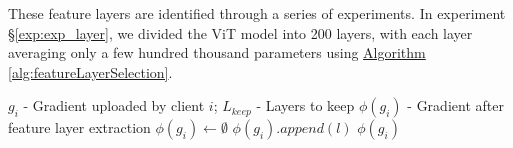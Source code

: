 \documentclass[conference]{IEEEtran}
\begin{document}
These feature layers are identified through a series of experiments. In experiment \hyperref[exp:exp_layer]{§\ref{exp:exp_layer}}, we divided the ViT model into 200 layers, with each layer averaging only a few hundred thousand parameters using \hyperref[alg:featureLayerSelection]{Algorithm \ref{alg:featureLayerSelection}}.



\begin{algorithm}
    \caption{Feature Layer Extraction}
    \label{alg:layerExtra}
    \begin{algorithmic}[1]
        \Require $g_i$ - Gradient uploaded by client $i$; $L_{keep}$ - Layers to keep
        \Ensure $\phi(g_i)$ - Gradient after feature layer extraction
            \State $\phi(g_i) \gets \emptyset$
                    \State $\phi(g_i).append(l)$
                \EndIf
            \EndFor
            \State \Return $\phi(g_i)$
        \EndFunction
    \end{algorithmic}
\end{algorithm}
\end{document}
